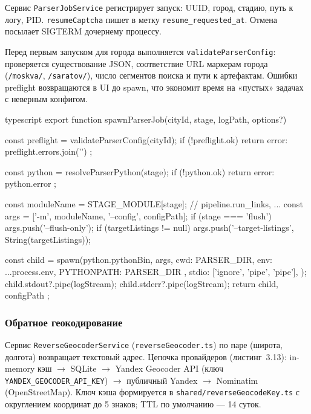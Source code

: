 Сервис \texttt{ParserJobService} регистрирует запуск: UUID, город, стадию, путь к логу, PID. \texttt{resumeCaptcha} пишет в  метку \texttt{resume\_requested\_at}. Отмена посылает SIGTERM дочернему процессу.

Перед первым запуском для города выполняется \texttt{validateParserConfig}: проверяется существование JSON, соответствие URL маркерам города (\texttt{/moskva/}, \texttt{/saratov/}), число сегментов поиска и пути к артефактам. Ошибки preflight возвращаются в UI до spawn, что экономит время на «пустых» задачах с неверным конфигом.

\begin{singleminted}{typescript}
export function spawnParserJob(cityId, stage, logPath, options?) {
    const preflight = validateParserConfig(cityId);
    if (!preflight.ok) {
        return { error: preflight.errors.join('\n') };
    }

    const python = resolveParserPython(stage);
    if (!python.ok) return { error: python.error };

    const moduleName = STAGE_MODULE[stage]; // pipeline.run_links, ...
    const args = ['-m', moduleName, '--config', configPath];
    if (stage === 'flush') args.push('--flush-only');
    if (targetListings != null) args.push('--target-listings', String(targetListings));

    const child = spawn(python.pythonBin, args, {
        cwd: PARSER_DIR,
        env: { ...process.env, PYTHONPATH: PARSER_DIR },
        stdio: ['ignore', 'pipe', 'pipe'],
    });
    child.stdout?.pipe(logStream);
    child.stderr?.pipe(logStream);
    return { child, configPath };
}
\end{singleminted}
\label{lst:parser-runner}

\subsubsection{Обратное геокодирование}

Сервис \texttt{ReverseGeocoderService} (\texttt{reverseGeocoder.ts}) по паре (широта, долгота) возвращает текстовый адрес. Цепочка провайдеров (листинг~3.13): in-memory кэш $\rightarrow$ SQLite $\rightarrow$ Yandex Geocoder API (ключ \texttt{YANDEX\_GEOCODER\_API\_KEY}) $\rightarrow$ публичный Yandex $\rightarrow$ Nominatim (OpenStreetMap). Ключ кэша формируется в \texttt{shared/reverseGeocodeKey.ts} с округлением координат до 5 знаков; TTL по умолчанию --- 14 суток.

